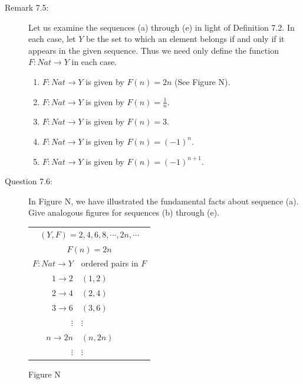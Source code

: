 \documentclass{book}
\begin{document}
\begin{description}
\item[Remark 7.5:] Let us examine the sequences (a) through (e) in light of Definition 7.2. In each case, let $Y$ be the set to which an element belongs if and only if it appears in the given sequence. Thus we need only define the function $F: Nat \rightarrow Y$ in each case.
\begin{enumerate}[\hspace{1cm}(a)]
  \item $F: Nat \rightarrow Y$ is given by $F(n) = 2n$ (See Figure N).
  \item $F: Nat \rightarrow Y$ is given by $F(n) = \frac{1}{n}$. 
  \item $F: Nat \rightarrow Y$ is given by $F(n) = 3$.
  \item $F: Nat \rightarrow Y$ is given by $F(n)=(-1)^{n}$.
  \item $F: Nat \rightarrow Y$ is given by $F(n)=(-1)^{n+1}$.
\end{enumerate}

\item[Question 7.6:] In Figure N, we have illustrated the fundamental facts about sequence (a). Give analogous figures for sequences (b) through (e).

\begin{center}
\begin{tabular}{rl}
  \multicolumn{2}{c}{$(Y, F) = 2, 4, 6, 8, \cdots, 2n, \cdots$} \\
  \multicolumn{2}{c}{$F(n) = 2n$} \\
  $F: Nat \rightarrow Y$ \hspace{0.25cm} & \hspace{0.25cm} ordered pairs in $F$ \\
  $1 \rightarrow 2$      \hspace{0.25cm} & \hspace{0.25cm} $(1,2)$ \\
  $2 \rightarrow 4$      \hspace{0.25cm} & \hspace{0.25cm} $(2,4)$ \\
  $3 \rightarrow 6$      \hspace{0.25cm} & \hspace{0.25cm} $(3,6)$ \\
  $\vdots$               \hspace{0.25cm} & \hspace{0.25cm} $\vdots$ \\
  $n \rightarrow 2n$     \hspace{0.25cm} & \hspace{0.25cm} $(n,2n)$ \\
  $\vdots$               \hspace{0.25cm} & \hspace{0.25cm} $\vdots$ \\
\end{tabular}
\end{center}
\begin{center}
Figure N
\end{center}


\end{description}
\end{document}
